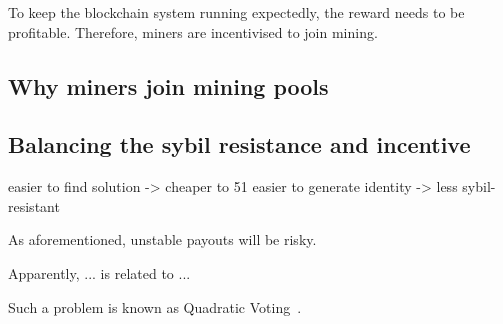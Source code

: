 To keep the blockchain system running expectedly, the reward needs to be profitable.
Therefore, miners are incentivised to join mining.

\subsection{Why miners join mining pools}



\subsection{Balancing the sybil resistance and incentive}


easier to find solution -> cheaper to 51 
easier to generate identity -> less sybil-resistant


As aforementioned, unstable payouts will be risky.


Apparently, 
... is related to ...

Such a problem is known as Quadratic Voting~\cite{lalley2018quadratic}.
